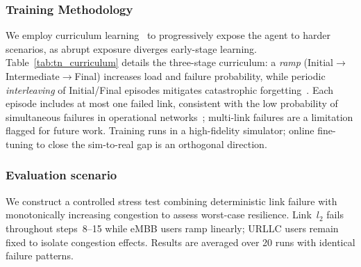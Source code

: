 \documentclass[12pt,lettersize,journal,onecolumn]{IEEEtran}
\begin{document}
\subsubsection{Training Methodology}\label{subsubsec:tn_curriculum}
We employ curriculum learning~\cite{nfvsdn23shahbazi} to progressively expose the agent to harder scenarios, as abrupt exposure diverges early-stage learning. Table~\ref{tab:tn_curriculum} details the three-stage curriculum: a \emph{ramp} (Initial$\to$Intermediate$\to$Final) increases load and failure probability, while periodic \emph{interleaving} of Initial/Final episodes mitigates catastrophic forgetting~\cite{marl24albrecht}. Each episode includes at most one failed link, consistent with the low probability of simultaneous failures in operational networks~\cite{tnse25nouruzi}; multi-link failures are a limitation flagged for future work. Training runs in a high-fidelity simulator; online fine-tuning to close the sim-to-real gap is an orthogonal direction.

\subsubsection{Evaluation scenario}\label{subsubsec:tn_scenario}
We construct a controlled stress test combining deterministic link failure with monotonically increasing congestion to assess worst-case resilience. Link~$l_2$ fails throughout steps~8--15 while eMBB users ramp linearly; URLLC users remain fixed to isolate congestion effects. Results are averaged over 20 runs with identical failure patterns.
\end{document}
